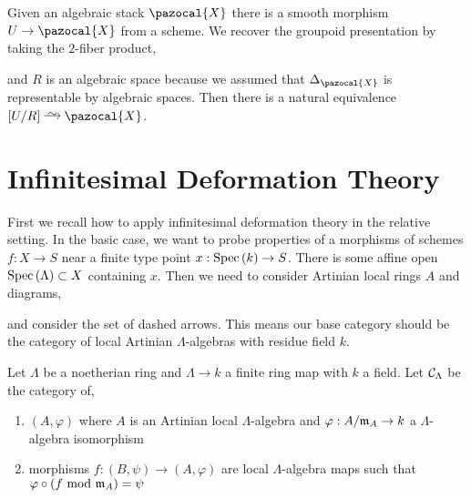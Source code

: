 \documentclass[12pt]{article}
\renewcommand{\X}{\pazocal{X}}
\begin{document}
\begin{prop}
Given an algebraic stack $\X$ there is a smooth morphism $U \to \X$ from a scheme. We recover the groupoid presentation by taking the $2$-fiber product,
\begin{center}
\end{center}
and $R$ is an algebraic space because we assumed that $\Delta_{\X}$ is representable by algebraic spaces. Then there is a natural equivalence $[U/R] \iso \X$.
\end{prop}

\section{Infinitesimal Deformation Theory}

\begin{rmk}
First we recall how to apply infinitesimal deformation theory in the relative setting. In the basic case, we want to probe properties of a morphisms of schemes $f : X \to S$ near a finite type point $x : \mathrm{Spec}\left( k \right) \to S$. There is some affine open $\mathrm{Spec}\left( \Lambda \right) \subset X$ containing $x$. Then we need to consider Artinian local rings $A$ and diagrams,
\begin{center}
\end{center}
and consider the set of dashed arrows. This means our base category should be the category of local Artinian $\Lambda$-algebras with residue field $k$.
\end{rmk}

\begin{defn}
Let $\Lambda$ be a noetherian ring and $\Lambda \to k$ a finite ring map with $k$ a field. Let $\mathcal{C}_\Lambda$ be the category of,
\begin{enumerate}
\item $(A, \varphi)$ where $A$ is an Artinian local $\Lambda$-algebra and $\varphi : A / \mathfrak{m}_A \to k$ a $\Lambda$-algebra isomorphism
\item morphisms $f : (B, \psi) \to (A, \varphi)$ are local $\Lambda$-algebra maps such that $\varphi \circ (f \text{ mod } \mathfrak{m}_A) = \psi$
\end{enumerate}
\end{defn}
\end{document}

